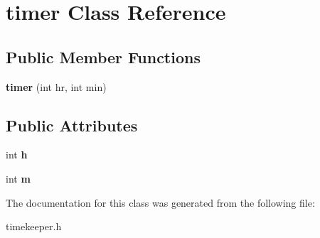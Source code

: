 \hypertarget{classtimer}{\section{timer \-Class \-Reference}
\label{classtimer}
}
\subsection*{\-Public \-Member \-Functions}
\begin{DoxyCompactItemize}
\item 
\hypertarget{classtimer_a0769bda45235baf5a515ce07b5bb47a5}{{\bfseries timer} (int hr, int min)}\label{classtimer_a0769bda45235baf5a515ce07b5bb47a5}

\end{DoxyCompactItemize}
\subsection*{\-Public \-Attributes}
\begin{DoxyCompactItemize}
\item 
\hypertarget{classtimer_a42e80ef8a2e70448183c7a18678bb3b9}{int {\bfseries h}}\label{classtimer_a42e80ef8a2e70448183c7a18678bb3b9}

\item 
\hypertarget{classtimer_ace261114d8331c0e4039cfaeac33afd8}{int {\bfseries m}}\label{classtimer_ace261114d8331c0e4039cfaeac33afd8}

\end{DoxyCompactItemize}


\-The documentation for this class was generated from the following file\-:\begin{DoxyCompactItemize}
\item 
timekeeper.\-h\end{DoxyCompactItemize}
